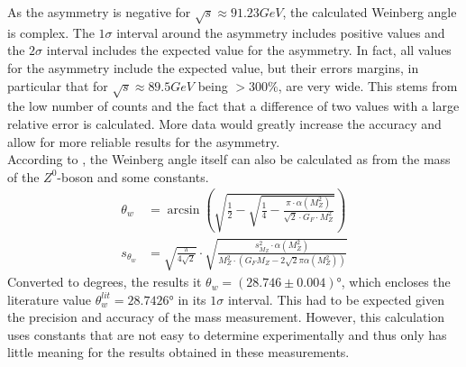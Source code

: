 As the asymmetry is negative for $\sqrt{s}\approx\unit{91.23}{GeV}$, the calculated Weinberg angle is complex. The $1\sigma$ interval around the asymmetry includes positive values and the $2\sigma$ interval includes the expected value for the asymmetry. In fact, all values for the asymmetry include the expected value, but their errors margins, in particular that for $\sqrt{s}\approx\unit{89.5}{GeV}$ being  $>300\%$, are very wide. This stems from the low number of counts and the fact that a difference of two values with a large relative error is calculated. More data would greatly increase the accuracy and allow for more reliable results for the asymmetry.\\
According to \cite{muenchen}, the Weinberg angle itself can also be calculated as from the mass of the $Z^0$-boson and some constants. 
\begin{equation}
\begin{aligned}
\theta_w&=\arcsin\left(\sqrt{\frac{1}{2}-\sqrt{\frac{1}{4}-\frac{\pi\cdot\alpha(M_Z^2)}{\sqrt{2}\cdot G_F\cdot M_Z^2}}}\right)\\
s_{\theta_w}&=\sqrt{\frac{\pi}{4\sqrt{2}}}\cdot\sqrt{\frac{s_{M_Z}^2\cdot\alpha(M_Z^2)}{M_Z^2\cdot(G_FM_Z-2\sqrt{2}\pi\alpha(M_Z^2))}}
\end{aligned}
\end{equation}
Converted to degrees, the results it $\theta_w=(28.746\pm0.004)$°, which encloses the literature value $\theta_w^{lit}=28.7426$° \cite{muenchen} in its $1\sigma$ interval. This had to be expected given the precision and accuracy of the mass measurement. However, this calculation uses constants that are not easy to determine experimentally and thus only has little meaning for the results obtained in these measurements.

